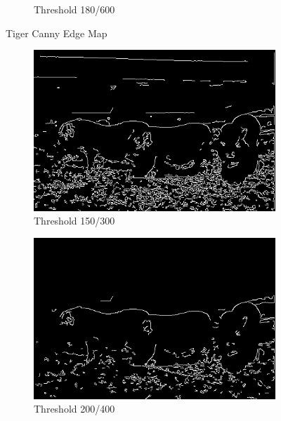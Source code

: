 \documentclass[12pt]{article}
\begin{document}
\begin{figure}[H]
\begin{subfigure}{0.32\textwidth}
		\caption{Threshold 180/600}
		\label{fig:tigerCanny.180_600}
	\end{subfigure}
	\caption{Tiger Canny Edge Map}
	\label{p1b1}
\end{figure}

\begin{figure}[H]
	\centering  %
	\begin{subfigure}{0.32\textwidth}
		\centering
		\includegraphics[width=\textwidth]{PigCanny150_300.jpg}
		\caption{Threshold 150/300}
		\label{fig:PigCanny.150_300}
	\end{subfigure}
	\hfill
	\begin{subfigure}{0.32\textwidth}
		\centering
		\includegraphics[width=\textwidth]{PigCanny200_400.jpg}
		\caption{Threshold 200/400}
		\label{fig:PigCanny.200_400}
	\end{subfigure}
	\hfill
	\begin{subfigure}{0.32\textwidth}

\end{subfigure}
\end{figure}
\end{document}
